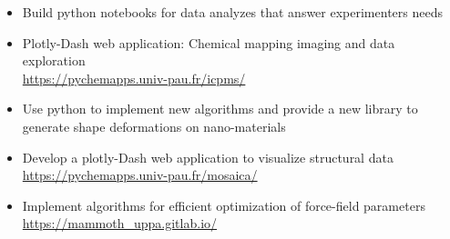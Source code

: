 \documentclass[10pt,a4paper,ragged2e]{../altacv}
\begin{document}
\medskip

\vspace{-2mm}
\begin{itemize}\setlength{\itemsep}{0ex}
    \item Build python notebooks for data analyzes that answer experimenters needs
    \item Plotly-Dash web application: Chemical mapping imaging and data exploration\\
    \url{https://pychemapps.univ-pau.fr/icpms/}
\end{itemize}

\medskip

\vspace{-2mm}
\begin{itemize}\setlength{\itemsep}{0ex}
    \item Use python to implement new algorithms and provide a new library to generate shape deformations on nano-materials
    \item Develop a plotly-Dash web application to visualize structural data\\
    \url{https://pychemapps.univ-pau.fr/mosaica/}
\end{itemize}


\medskip

\vspace{-2mm}
\begin{itemize}\setlength{\itemsep}{0ex}
    \item Implement algorithms for efficient optimization of force-field parameters\\
    \url{https://mammoth_uppa.gitlab.io/}
\end{itemize}
\end{document}
